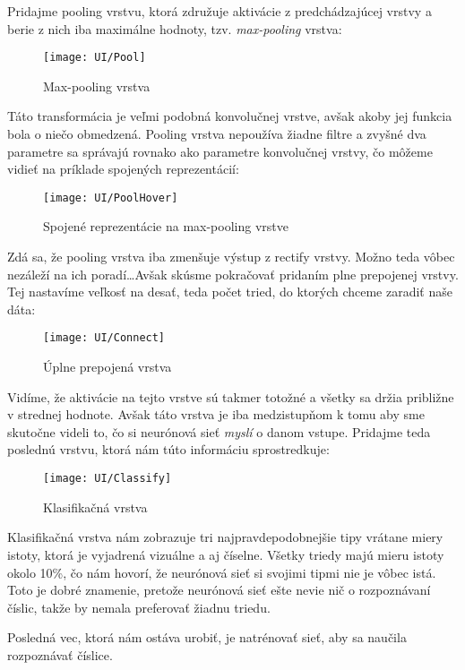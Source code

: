 \bigskip

Pridajme pooling vrstvu, ktorá združuje aktivácie z predchádzajúcej vrstvy a berie z nich iba maximálne hodnoty, tzv. \emph{max-pooling} vrstva:

\begin{figure}[H]
  \centering
  \texttt{[image: UI/Pool]}
  \caption{Max-pooling vrstva}
\end{figure}

Táto transformácia je veľmi podobná konvolučnej vrstve, avšak akoby jej funkcia bola  o niečo obmedzená. Pooling vrstva nepoužíva žiadne filtre a zvyšné dva parametre sa správajú rovnako ako parametre konvolučnej vrstvy, čo môžeme vidieť na príklade spojených reprezentácií:

\begin{figure}[H]
  \centering
  \texttt{[image: UI/PoolHover]}
  \caption{Spojené reprezentácie na max-pooling vrstve}
\end{figure}

Zdá sa, že pooling vrstva iba zmenšuje výstup z rectify vrstvy. Možno teda vôbec nezáleží na ich poradí\dots Avšak skúsme pokračovať pridaním plne prepojenej vrstvy. Tej nastavíme veľkosť na desať, teda počet tried, do ktorých chceme zaradiť naše dáta:

\begin{figure}[H]
  \centering
  \texttt{[image: UI/Connect]}
  \caption{Úplne prepojená vrstva}
\end{figure}

Vidíme, že aktivácie na tejto vrstve sú takmer totožné a všetky sa držia približne v strednej hodnote. Avšak táto vrstva je iba medzistupňom k tomu aby sme skutočne videli to, čo si neurónová sieť \emph{myslí} o danom vstupe. Pridajme teda poslednú vrstvu, ktorá nám túto informáciu sprostredkuje:

\begin{figure}[H]
  \centering
  \texttt{[image: UI/Classify]}
  \caption{Klasifikačná vrstva}
\end{figure}

Klasifikačná vrstva nám zobrazuje tri najpravdepodobnejšie tipy vrátane miery istoty, ktorá je vyjadrená vizuálne a aj číselne. Všetky triedy majú mieru istoty okolo 10\%, čo nám hovorí, že neurónová sieť si svojimi tipmi nie je vôbec istá. Toto je dobré znamenie, pretože neurónová sieť ešte nevie nič o rozpoznávaní číslic, takže by nemala preferovať žiadnu triedu.

Posledná vec, ktorá nám ostáva urobiť, je natrénovať sieť, aby sa naučila rozpoznávať číslice.

